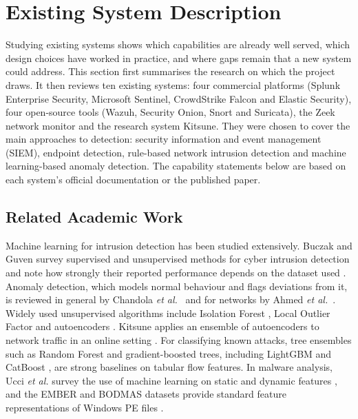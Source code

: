 \section{Existing System Description}

Studying existing systems shows which capabilities are already well served, which design choices have worked in practice, and where gaps remain that a new system could address. This section first summarises the research on which the project draws. It then reviews ten existing systems: four commercial platforms (Splunk Enterprise Security, Microsoft Sentinel, CrowdStrike Falcon and Elastic Security), four open-source tools (Wazuh, Security Onion, Snort and Suricata), the Zeek network monitor and the research system Kitsune. They were chosen to cover the main approaches to detection: security information and event management (SIEM), endpoint detection, rule-based network intrusion detection and machine learning-based anomaly detection. The capability statements below are based on each system's official documentation or the published paper.

\subsection{Related Academic Work}

Machine learning for intrusion detection has been studied extensively. Buczak and Guven survey supervised and unsupervised methods for cyber intrusion detection and note how strongly their reported performance depends on the dataset used \cite{buczak2016survey}. Anomaly detection, which models normal behaviour and flags deviations from it, is reviewed in general by Chandola \textit{et al.}~\cite{chandola2009anomaly} and for networks by Ahmed \textit{et al.}~\cite{ahmed2016anomaly}. Widely used unsupervised algorithms include Isolation Forest \cite{liu2008iforest}, Local Outlier Factor \cite{breunig2000lof} and autoencoders \cite{hinton2006autoencoder}. Kitsune applies an ensemble of autoencoders to network traffic in an online setting \cite{mirsky2018kitsune}. For classifying known attacks, tree ensembles such as Random Forest \cite{breiman2001rf} and gradient-boosted trees, including LightGBM \cite{ke2017lightgbm} and CatBoost \cite{prokhorenkova2018catboost}, are strong baselines on tabular flow features. In malware analysis, Ucci \textit{et al.} survey the use of machine learning on static and dynamic features \cite{ucci2019malware}, and the EMBER and BODMAS datasets provide standard feature representations of Windows PE files \cite{anderson2018ember,yang2021bodmas}.

